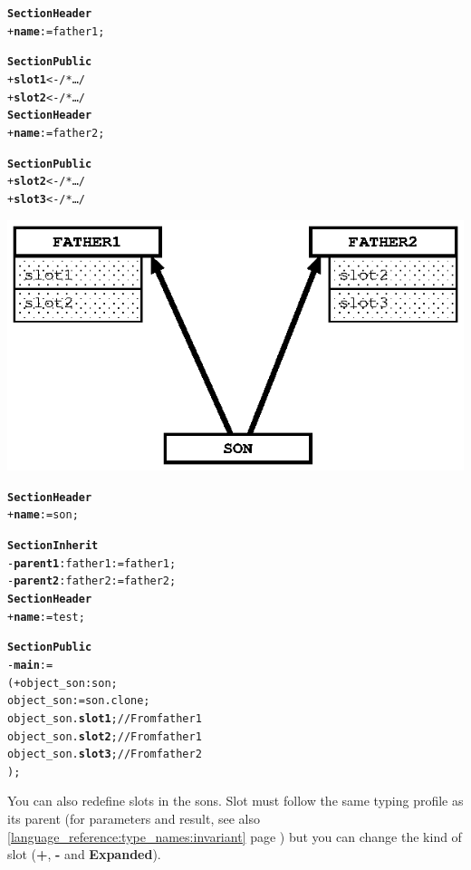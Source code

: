 \documentclass[11pt]{mybook}
\begin{document}
\begin{alltt}
{\bf{}Section Header}
  + {\bf{}name}     := {\sc{}father1};          

{\bf{}Section Public}
  + {\bf{}slot1} <- /* \ldots */
  + {\bf{}slot2} <- /* \ldots */\\

{\bf{}Section Header}
  + {\bf{}name}     := {\sc{}father2};          

{\bf{}Section Public}
  + {\bf{}slot2} <- /* \ldots */
  + {\bf{}slot3} <- /* \ldots */\\

\begin{center}
\includegraphics[scale=1.0]{figures/inherit_figure}
\end{center}

{\bf{}Section Header}
  + {\bf{}name}     := {\sc{}son};          

{\bf{}Section Inherit}
  - {\bf{}parent1}:{\sc{}father1} := {\sc{}father1};
  - {\bf{}parent2}:{\sc{}father2} := {\sc{}father2};\\

{\bf{}Section Header}
  + {\bf{}name}     := {\sc{}test};          

{\bf{}Section Public}
  - {\bf{}main} :=
  ( + object_son:{\sc{}son};
    object_son := {\sc{}son}.clone;
    object_son.{\bf{}slot1};    // From {\sc{}father1}
    object_son.{\bf{}slot2};    // From {\sc{}father1}
    object_son.{\bf{}slot3};    // From {\sc{}father2}
  );

\end{alltt}
You can also redefine slots in the sons. Slot must follow the same typing profile as its parent (for parameters and result, see also {\ref{language_reference:type_names:invariant} page \pageref{language_reference:type_names:invariant}}) but you can change the kind of slot ({\bf{}+}, {\bf{}-} and {\bf{}Expanded}).
\end{document}
